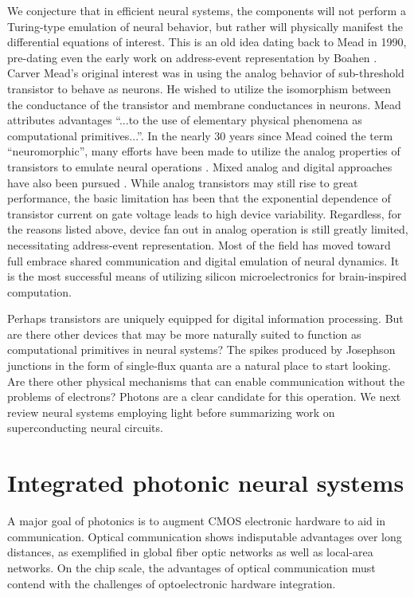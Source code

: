 \documentclass[twocolumn]{article}
\begin{document}
We conjecture that in efficient neural systems, the components will not perform a Turing-type emulation of neural behavior, but rather will physically manifest the differential equations of interest. This is an old idea \cite{me1990} dating back to Mead in 1990, pre-dating even the early work on address-event representation by Boahen \cite{bo2000}. Carver Mead's original interest was in using the analog behavior of sub-threshold transistor to behave as neurons. He wished to utilize the isomorphism between the conductance of the transistor and membrane conductances in neurons. Mead attributes advantages ``...to the use of elementary physical phenomena as computational primitives...''. In the nearly 30 years since Mead coined the term ``neuromorphic'', many efforts have been made to utilize the analog properties of transistors to emulate neural operations \cite{hama2013}. Mixed analog and digital approaches have also been pursued \cite{}. While analog transistors may still rise to great performance, the basic limitation has been that the exponential dependence of transistor current on gate voltage leads to high device variability. Regardless, for the reasons listed above, device fan out in analog operation is still greatly limited, necessitating address-event representation. Most of the field has moved toward full embrace shared communication and digital emulation of neural dynamics. It is the most successful means of utilizing silicon microelectronics for brain-inspired computation.

Perhaps transistors are uniquely equipped for digital information processing. But are there other devices that may be more naturally suited to function as computational primitives in neural systems? The spikes produced by Josephson junctions in the form of single-flux quanta are a natural place to start looking. Are there other physical mechanisms that can enable communication without the problems of electrons? Photons are a clear candidate for this operation. We next review neural systems employing light before summarizing work on superconducting neural circuits.

\section{\label{sec:integratedPhotonics}Integrated photonic neural systems}
A major goal of photonics is to augment CMOS electronic hardware to aid in communication. Optical communication shows indisputable advantages over long distances, as exemplified in global fiber optic networks as well as local-area networks. On the chip scale, the advantages of optical communication must contend with the challenges of optoelectronic hardware integration. 
\end{document}
